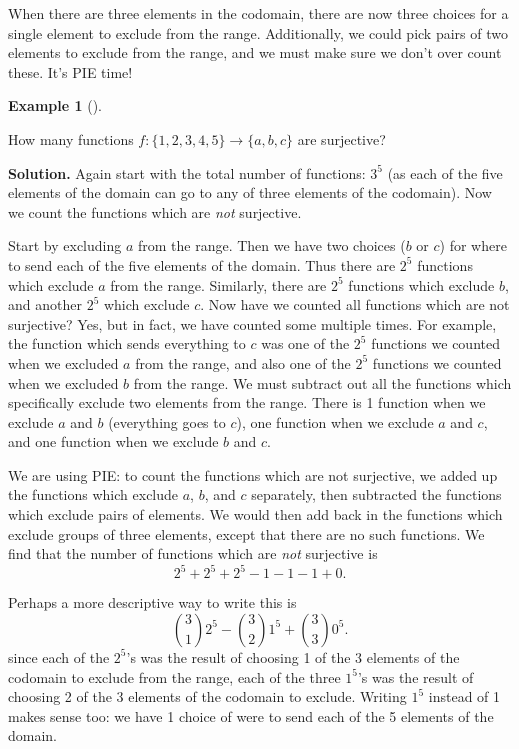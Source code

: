 \documentclass[10pt,]{book}
\theoremstyle{plain}
\theoremstyle{definition}
\newtheorem{example}[theorem]{Example}
\theoremstyle{definition}
\theoremstyle{definition}
\numberwithin{equation}{chapter}
\begin{document}
    When there are three elements in the codomain, there are now three choices for a single element to exclude from the range. Additionally, we could pick pairs of two elements to exclude from the range, and we must make sure we don't over count these. It's PIE time!
\begin{example}[]\label{example-53}

    How many functions \(f: \{1,2,3,4,5\} \to \{a,b,c\}\) are surjective?
\par\medskip\noindent%
\textbf{Solution.}\quad
    Again start with the total number of functions: \(3^5\) (as each of the five elements of the domain can go to any of three elements of the codomain). Now we count the functions which are \emph{not} surjective.
\par

    Start by excluding \(a\) from the range. Then we have two choices (\(b\) or \(c\)) for where to send each of the five elements of the domain. Thus there are \(2^5\) functions which exclude \(a\) from the range. Similarly, there are \(2^5\) functions which exclude \(b\), and another \(2^5\) which exclude \(c\). Now have we counted all functions which are not surjective? Yes, but in fact, we have counted some multiple times. For example, the function which sends everything to \(c\) was one of the \(2^5\) functions we counted when we excluded \(a\) from the range, and also one of the \(2^5\) functions we counted when we excluded \(b\) from the range. We must subtract out all the functions which specifically exclude two elements from the range. There is 1 function when we exclude \(a\) and \(b\) (everything goes to \(c\)), one function when we exclude \(a\) and \(c\), and one function when we exclude \(b\) and \(c\).
\par

    We are using PIE: to count the functions which are not surjective, we added up the functions which exclude \(a\), \(b\), and \(c\) separately, then subtracted the functions which exclude pairs of elements. We would then add back in the functions which exclude groups of three elements, except that there are no such functions. We find that the number of functions which are \emph{not} surjective is
    \begin{equation*}
      2^5 + 2^5 + 2^5 - 1 - 1 - 1 + 0.
    \end{equation*}
\par

    Perhaps a more descriptive way to write this is
    \begin{equation*}
      {3 \choose 1}2^5 - {3 \choose 2}1^5 + {3 \choose 3}0^5.
    \end{equation*}
    since each of the \(2^5\)'s was the result of choosing 1 of the 3 elements of the codomain to exclude from the range, each of the three \(1^5\)'s was the result of choosing 2 of the 3 elements of the codomain to exclude. Writing \(1^5\) instead of 1 makes sense too: we have 1 choice of were to send each of the 5 elements of the domain.
\par


\end{example}
\end{document}
